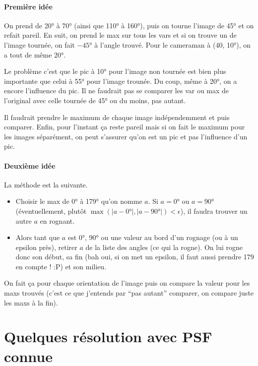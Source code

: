 \documentclass{article}
\begin{document}
\paragraph{Première idée}
On prend de \ang{20} à \ang{70} (ainsi que \ang{110} à \ang{160}), puis on tourne l'image de \ang{45} et on refait pareil.
En suit, on prend le max sur tous les vars et si on trouve un de l'image tournée, on fait $-\ang{45}$ à l'angle trouvé.
Pour le cameraman à (40, \ang{10}), on a tout de même \ang{20}.

Le problème c'est que le pic à \ang{10} pour l'image non tournée est bien plus importante que celui à \ang{55} pour l'image trounée.
Du coup, même à \ang{20}, on a encore l'influence du pic.
Il ne faudrait pas se comparer les var ou max de l'original avec celle tournée de \ang{45} ou du moins, pas autant.

Il faudrait prendre le maximum de chaque image indépendemment et puis comparer.
Enfin, pour l'instant ça reste pareil mais si on fait le maximum pour les images séparément, on peut s'assurer qu'on est un pic et pas l'influence d'un pic.

\paragraph{Deuxième idée}
La méthode est la suivante.
\begin{itemize}
  \item Choisir le max de \ang{0} à \ang{179} qu'on nomme $a$.
    Si $a = \ang{0}$ ou $a = \ang{90}$ (éventuellement, plutôt $\max(|a - \ang{0}|, |a-\ang{90}|) < \epsilon$), il faudra trouver un autre $a$ en rognant.
  \item
    Alors tant que $a$ est \ang{0}, \ang{90} ou une valeur au bord d'un rognage (ou à un epsilon près),
    retirer $a$ de la liste des angles (ce qui la rogne).
    On lui rogne donc son début, sa fin (bah oui, si on met un epsilon, il faut aussi prendre 179 en compte ! :P) et son milieu.
\end{itemize}
On fait ça pour chaque orientation de l'image puis on compare la valeur pour les maxs trouvés (c'est ce que j'entends par ``pas autant'' comparer, on compare juste les maxs à la fin).

\section{Quelques résolution avec PSF connue}
\end{document}
